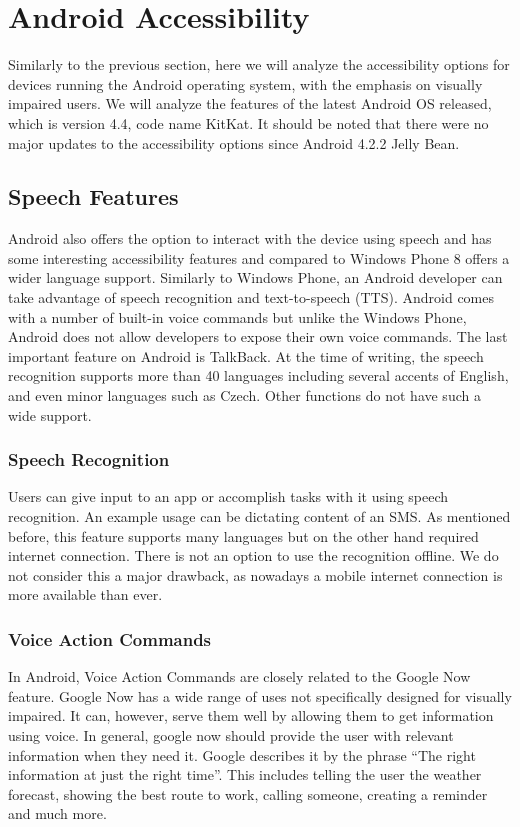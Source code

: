 \section{Android Accessibility}
Similarly to the previous section, here we will analyze the accessibility options for devices running the Android operating system, with the emphasis on visually impaired users. We will analyze the features of the latest Android OS released, which is version 4.4, code name KitKat. It should be noted that there were no major updates to the accessibility options since Android 4.2.2 Jelly Bean.
\subsection{Speech Features}
Android also offers the option to interact with the device using speech and has some interesting accessibility features and compared to Windows Phone 8 offers a wider language support. Similarly to Windows Phone, an Android developer can take advantage of speech recognition and text-to-speech (TTS). Android comes with a number of built-in voice commands but unlike the Windows Phone, Android does not allow developers to expose their own voice commands. The last important feature on Android is TalkBack.
At the time of writing, the speech recognition supports more than 40 languages including several accents of English, and even minor languages such as Czech. Other functions do not have such a wide support. 
\subsubsection{Speech Recognition}
Users can give input to an app or accomplish tasks with it using speech recognition. An example usage can be dictating content of an SMS. As mentioned before, this feature supports many languages but on the other hand required internet connection. There is not an option to use the recognition offline. We do not consider this a major drawback, as nowadays a mobile internet connection is more available than ever.
\subsubsection{Voice Action Commands}
In Android, Voice Action Commands are closely related to the Google Now feature. Google Now has a wide range of uses not specifically designed for visually impaired. It can, however, serve them well by allowing them to get information using voice.
In general, google now should provide the user with relevant information when they need it. Google describes it by the phrase “The right information at just the right time”. This includes telling the user the weather forecast, showing the best route to work, calling someone, creating a reminder and much more.

